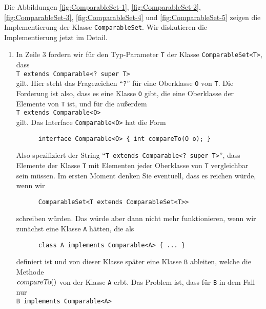 Die Abbildungen 
\ref{fig:ComparableSet-1}, \ref{fig:ComparableSet-2}, \ref{fig:ComparableSet-3},
\ref{fig:ComparableSet-4} und \ref{fig:ComparableSet-5}
zeigen die Implementierung der Klasse \texttt{ComparableSet}.  Wir diskutieren die
Implementierung jetzt im Detail.
\begin{enumerate}
\item In Zeile 3 fordern wir f\"ur den Typ-Parameter \texttt{T} der Klasse
      \texttt{ComparableSet<T>}, dass
      \\[0.2cm]
      \hspace*{1.3cm}
      \texttt{T extends Comparable<? super T>}
      \\[0.2cm]
      gilt.  Hier steht das Fragezeichen ``\texttt{?}'' f\"ur eine Oberklasse \texttt{O}
      von \texttt{T}.  Die Forderung ist also, dass es eine Klasse \texttt{O} gibt, die
      eine Oberklasse der Elemente von \texttt{T} ist, und f\"ur die au{\ss}erdem
      \\[0.2cm]
      \hspace*{1.3cm}
      \texttt{T extends Comparable<O>}
      \\[0.2cm]
      gilt.  Das Interface \texttt{Comparable<O>} hat die Form
      \begin{verbatim}
      interface Comparable<O> { int compareTo(O o); }
      \end{verbatim}
      Also spezifiziert der String ``\texttt{T extends Comparable<? super T>}'', dass
      Elemente der Klasse \texttt{T} mit Elementen jeder Oberklasse von \texttt{T}
      vergleichbar sein m\"ussen.  Im ersten Moment denken Sie eventuell, dass es reichen
      w\"urde, wenn wir 
\begin{verbatim}
      ComparableSet<T extends ComparableSet<T>>
\end{verbatim}
      schreiben w\"urden.  Das w\"urde aber dann nicht mehr funktionieren, wenn wir zun\"achst
      eine Klasse \texttt{A} h\"atten, die als
\begin{verbatim}
      class A implements Comparable<A> { ... }
\end{verbatim}
      definiert ist und von dieser Klasse sp\"ater eine Klasse \texttt{B} ableiten, welche die
      Methode\\
      $\textsl{compareTo}()$ von der Klasse \texttt{A} erbt.  Das Problem ist,
      dass f\"ur \texttt{B} in dem Fall nur
      \\[0.2cm]
      \hspace*{1.3cm}
      \texttt{B implements Comparable<A>}
      \\[0.2cm]

\end{enumerate}
